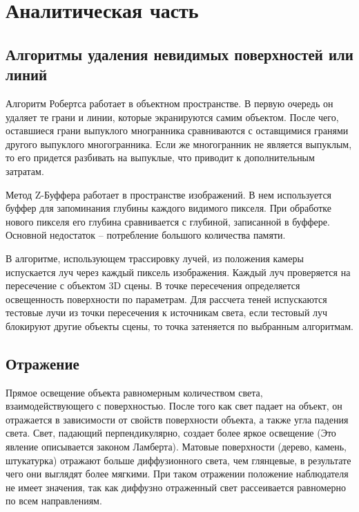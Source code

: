 

\usepackage{hyperref}


\setcounter{page}{2}
\renewcommand{\contentsname}{\hfill СОДЕРЖАНИЕ \hfill}
\tableofcontents

\chapter{Аналитическая часть}
\section{Алгоритмы удаления невидимых поверхностей или линий}
Алгоритм Робертса работает в объектном пространстве. В первую очередь он удаляет те грани и линии, которые экранируются самим объектом. После чего, оставшиеся грани выпуклого многранника сравниваются с оставщимися гранями другого выпуклого многогранника. Если же многогранник не является выпуклым, то его придется разбивать на выпуклые, что приводит к дополнительным затратам. 


Метод Z-Буффера работает в пространстве изображений. В нем используется буффер для запоминания глубины каждого видимого пикселя. При обработке нового пикселя его глубина сравнивается с глубиной, записанной в буффере. Основной недостаток -- потребление большого количества памяти. 

В алгоритме, использующем трассировку лучей, из положения камеры испускается луч через каждый пиксель изображения. Каждый луч проверяется на пересечение с объектом 3D сцены. В точке пересечения определяется освещенность поверхности по параметрам. Для рассчета теней испускаются тестовые лучи из точки пересечения к источникам света, если тестовый луч блокируют другие объекты сцены, то точка затеняется по выбранным алгоритмам. 


\section{Отражение}
Прямое освещение объекта равномерным количеством света, взаимодействующего с поверхностью. После того как свет падает на объект, он отражается в зависимости от свойств поверхности объекта, а также угла падения света. Свет, падающий перпендикулярно, создает более яркое освещение (Это явление описывается законом Ламберта). Матовые поверхности (дерево, камень, штукатурка) отражают больше диффузионного света, чем глянцевые, в результате чего они выглядят более мягкими.
При таком отражении положение наблюдателя не имеет значения, так как диффузно отраженный свет рассеивается равномерно по всем направлениям.

